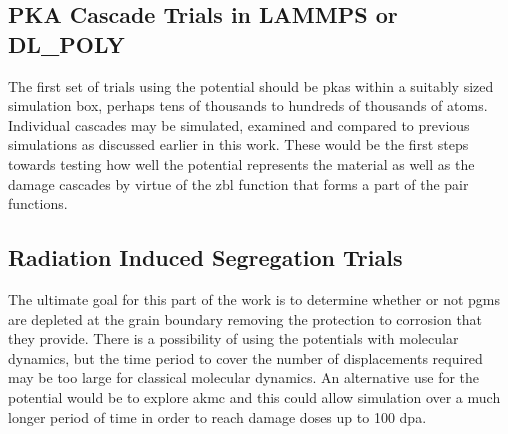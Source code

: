 \subsection{PKA Cascade Trials in LAMMPS or DL\_POLY}

The first set of trials using the potential should be \acrshort{pka}s within a suitably sized simulation box, perhaps tens of thousands to hundreds of thousands of atoms.  Individual cascades may be simulated, examined and compared to previous simulations as discussed earlier in this work.  These would be the first steps towards testing how well the potential represents the material as well as the damage cascades by virtue of the \acrshort{zbl} function that forms a part of the pair functions.
 

\subsection{Radiation Induced Segregation Trials}

The ultimate goal for this part of the work is to determine whether or not \acrshort{pgm}s are depleted at the grain boundary removing the protection to corrosion that they provide.  There is a possibility of using the potentials with molecular dynamics, but the time period to cover the number of displacements required may be too large for classical molecular dynamics.  An alternative use for the potential would be to explore \acrfull{akmc} and this could allow simulation over a much longer period of time in order to reach damage doses up to 100 \acrshort{dpa}.



